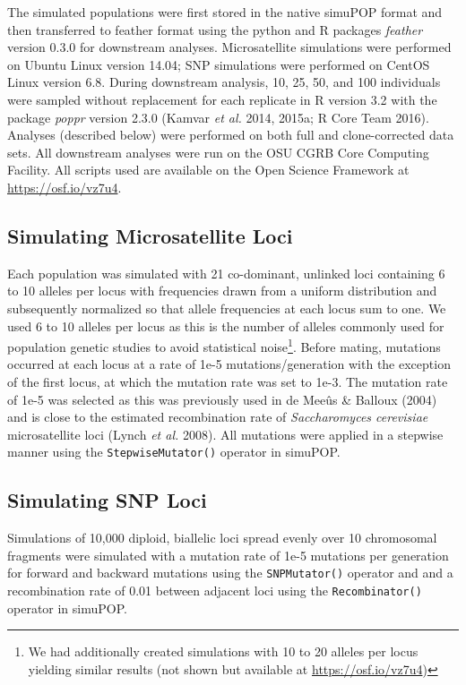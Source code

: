 \documentclass[]{article}
\let\rmarkdownfootnote\footnote%
\def\footnote{\protect\rmarkdownfootnote}
\theoremstyle{definition}
\theoremstyle{definition}
\theoremstyle{definition}
\theoremstyle{remark}
\begin{document}
The simulated populations were first stored in the native simuPOP format
and then transferred to feather format using the python and R packages
\emph{feather} version 0.3.0 for downstream analyses. Microsatellite
simulations were performed on Ubuntu Linux version 14.04; SNP
simulations were performed on CentOS Linux version 6.8. During
downstream analysis, 10, 25, 50, and 100 individuals were sampled
without replacement for each replicate in R version 3.2 with the package
\emph{poppr} version 2.3.0 (Kamvar \emph{et al.} 2014, 2015a; R Core
Team 2016). Analyses (described below) were performed on both full and
clone-corrected data sets. All downstream analyses were run on the OSU
CGRB Core Computing Facility. All scripts used are available on the Open
Science Framework at \url{https://osf.io/vz7u4}.

\subsection{Simulating Microsatellite
Loci}\label{simulating-microsatellite-loci}

Each population was simulated with 21 co-dominant, unlinked loci
containing 6 to 10 alleles per locus with frequencies drawn from a
uniform distribution and subsequently normalized so that allele
frequencies at each locus sum to one. We used 6 to 10 alleles per locus
as this is the number of alleles commonly used for population genetic
studies to avoid statistical noise\footnote{We had additionally created
  simulations with 10 to 20 alleles per locus yielding similar results
  (not shown but available at \url{https://osf.io/vz7u4})}. Before
mating, mutations occurred at each locus at a rate of 1e-5
mutations/generation with the exception of the first locus, at which the
mutation rate was set to 1e-3. The mutation rate of 1e-5 was selected as
this was previously used in de Meeûs \& Balloux (2004) and is close to
the estimated recombination rate of \emph{Saccharomyces cerevisiae}
microsatellite loci (Lynch \emph{et al.} 2008). All mutations were
applied in a stepwise manner using the \texttt{StepwiseMutator()}
operator in simuPOP.

\subsection{Simulating SNP Loci}\label{simulating-snp-loci}

Simulations of 10,000 diploid, biallelic loci spread evenly over 10
chromosomal fragments were simulated with a mutation rate of 1e-5
mutations per generation for forward and backward mutations using the
\texttt{SNPMutator()} operator and and a recombination rate of 0.01
between adjacent loci using the \texttt{Recombinator()} operator in
simuPOP.
\end{document}
